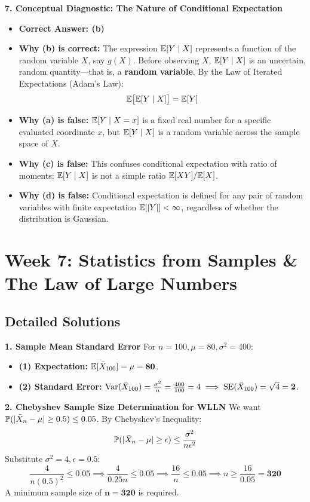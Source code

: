 \textbf{7. Conceptual Diagnostic: The Nature of Conditional Expectation}
\begin{itemize}
    \item \textbf{Correct Answer: (b)}
    \item \textbf{Why (b) is correct:} The expression $\E[Y \mid X]$ represents a function of the random variable $X$, say $g(X)$. Before observing $X$, $\E[Y \mid X]$ is an uncertain, random quantity---that is, a \textbf{random variable}. By the Law of Iterated Expectations (Adam's Law):
    $$\E\big[\E[Y \mid X]\big] = \E[Y]$$
    \item \textbf{Why (a) is false:} $\E[Y \mid X = x]$ is a fixed real number for a specific evaluated coordinate $x$, but $\E[Y \mid X]$ is a random variable across the sample space of $X$.
    \item \textbf{Why (c) is false:} This confuses conditional expectation with ratio of moments; $\E[Y \mid X]$ is not a simple ratio $\E[XY]/\E[X]$.
    \item \textbf{Why (d) is false:} Conditional expectation is defined for any pair of random variables with finite expectation $\E[|Y|] < \infty$, regardless of whether the distribution is Gaussian.
\end{itemize}

\section*{Week 7: Statistics from Samples \& The Law of Large Numbers}

\subsection*{Detailed Solutions}

\textbf{1. Sample Mean Standard Error}
For $n = 100, \mu = 80, \sigma^2 = 400$:
\begin{itemize}
    \item \textbf{(1) Expectation:} $\E[\bar{X}_{100}] = \mu = \mathbf{80}$.
    \item \textbf{(2) Standard Error:} $\Var(\bar{X}_{100}) = \frac{\sigma^2}{n} = \frac{400}{100} = 4 \implies \text{SE}(\bar{X}_{100}) = \sqrt{4} = \mathbf{2}$.
\end{itemize}

\textbf{2. Chebyshev Sample Size Determination for WLLN}
We want $\P(|\bar{X}_n - \mu| \ge 0.5) \le 0.05$. By Chebyshev's Inequality:
$$\P(|\bar{X}_n - \mu| \ge \epsilon) \le \frac{\sigma^2}{n \epsilon^2}$$
Substitute $\sigma^2 = 4, \epsilon = 0.5$:
$$\frac{4}{n (0.5)^2} \le 0.05 \implies \frac{4}{0.25 n} \le 0.05 \implies \frac{16}{n} \le 0.05 \implies n \ge \frac{16}{0.05} = \mathbf{320}$$
A minimum sample size of $\mathbf{n = 320}$ is required.

